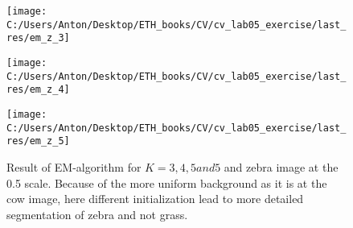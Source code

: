 \documentclass{report}
\begin{document}
\begin{figure}[h!]
	\begin{center}
		\begin{minipage}[h]{0.31\linewidth}
			\texttt{[image: C:/Users/Anton/Desktop/ETH\_books/CV/cv\_lab05\_exercise/last\_res/em\_z\_3]}
		\end{minipage}
		\hfill
		\begin{minipage}[h]{0.31\linewidth}
			\texttt{[image: C:/Users/Anton/Desktop/ETH\_books/CV/cv\_lab05\_exercise/last\_res/em\_z\_4]}
		\end{minipage}
		\hfill
		\begin{minipage}[h]{0.31\linewidth}
			\texttt{[image: C:/Users/Anton/Desktop/ETH\_books/CV/cv\_lab05\_exercise/last\_res/em\_z\_5]}
		\end{minipage}
		\caption{Result of EM-algorithm for $K=3, 4, 5 and 5$ and zebra image at the 0.5 scale. Because of the more uniform background as it is at the cow image, here different initialization lead to more detailed segmentation of zebra and not grass.}
	\end{center}
\end{figure}
\fi
\end{document}
